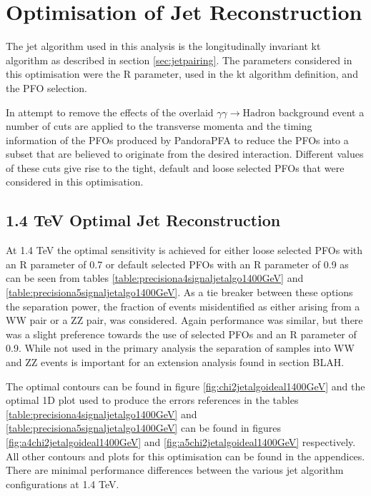 \section{Optimisation of Jet Reconstruction} \label{sec:optimisationjetalgo}
The jet algorithm used in this analysis is the longitudinally invariant kt algorithm as described in section \ref{sec:jetpairing}.  The parameters considered in this optimisation were the R parameter, used in the kt algorithm definition, and the PFO selection.  

In attempt to remove the effects of the overlaid $\gamma\gamma \rightarrow \text{Hadron}$ background event a number of cuts \cite{arXiv:1209.4039} are applied to the transverse momenta and the timing information of the PFOs produced by PandoraPFA to reduce the PFOs into a subset that are believed to originate from the desired interaction.  Different values of these cuts give rise to the tight, default and loose selected PFOs that were considered in this optimisation.  



\subsection{1.4 TeV Optimal Jet Reconstruction}
At 1.4 TeV the optimal sensitivity is achieved for either loose selected PFOs with an R parameter of 0.7 or default selected PFOs with an R parameter of 0.9 as can be seen from tables \ref{table:precisiona4signaljetalgo1400GeV} and \ref{table:precisiona5signaljetalgo1400GeV}.  As a tie breaker between these options the separation power, the fraction of events misidentified as either arising from a WW pair or a ZZ pair, was considered.  Again performance was similar, but there was a slight preference towards the use of selected PFOs and an R parameter of 0.9.  While not used in the primary analysis the separation of samples into WW and ZZ events is important for an extension analysis found in section BLAH.  

The optimal contours can be found in figure \ref{fig:chi2jetalgoideal1400GeV} and the optimal 1D plot used to produce the errors references in the tables \ref{table:precisiona4signaljetalgo1400GeV} and \ref{table:precisiona5signaljetalgo1400GeV} can be found in figures \ref{fig:a4chi2jetalgoideal1400GeV} and \ref{fig:a5chi2jetalgoideal1400GeV} respectively.  All other contours and plots for this optimisation can be found in the appendices.  There are minimal performance differences between the various jet algorithm configurations at 1.4 TeV.

